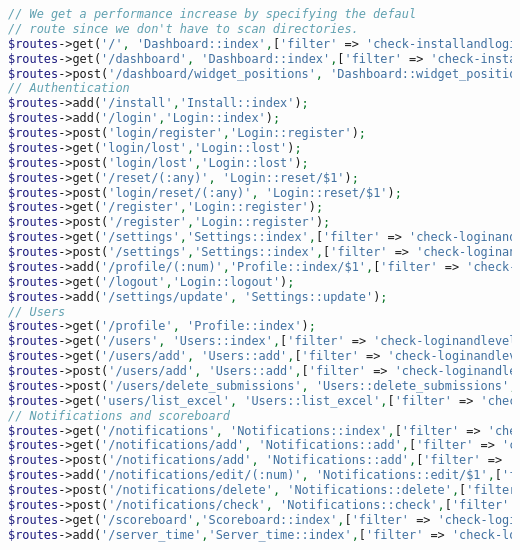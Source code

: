 \begin{lstlisting}[language=PHP, caption=Penambahan \textit{routes} yang digunakan pada aplikasi \textit{SharIF Judge}, label=kode:routesbab4]
// We get a performance increase by specifying the defaul
// route since we don't have to scan directories.
$routes->get('/', 'Dashboard::index',['filter' => 'check-installandlogin:dual,noreturn']);
$routes->get('/dashboard', 'Dashboard::index',['filter' => 'check-installandlogin:dual,noreturn']);
$routes->post('/dashboard/widget_positions', 'Dashboard::widget_positions');
// Authentication
$routes->add('/install','Install::index');
$routes->add('/login','Login::index');
$routes->post('login/register','Login::register');
$routes->get('login/lost','Login::lost');
$routes->post('login/lost','Login::lost');
$routes->get('/reset/(:any)', 'Login::reset/$1');
$routes->post('login/reset/(:any)', 'Login::reset/$1');
$routes->get('/register','Login::register');
$routes->post('/register','Login::register');
$routes->get('/settings','Settings::index',['filter' => 'check-loginandlevelAdmin:dual,noreturn']);
$routes->post('/settings','Settings::index',['filter' => 'check-loginandlevelAdmin:dual,noreturn']);
$routes->add('/profile/(:num)','Profile::index/$1',['filter' => 'check-login:dual,noreturn']);
$routes->get('/logout','Login::logout');
$routes->add('/settings/update', 'Settings::update');
// Users
$routes->get('/profile', 'Profile::index');
$routes->get('/users', 'Users::index',['filter' => 'check-loginandlevelAdmin:dual,noreturn']);
$routes->get('/users/add', 'Users::add',['filter' => 'check-loginandlevelAdmin:dual,noreturn']);
$routes->post('/users/add', 'Users::add',['filter' => 'check-loginandlevelAdmin:dual,noreturn']);
$routes->post('/users/delete_submissions', 'Users::delete_submissions',['filter' => 'check-loginandlevelAdmin:dual,noreturn']);
$routes->get('users/list_excel', 'Users::list_excel',['filter' => 'check-loginandlevelAdmin:dual,noreturn']);
// Notifications and scoreboard
$routes->get('/notifications', 'Notifications::index',['filter' => 'check-login:dual,noreturn']);
$routes->get('/notifications/add', 'Notifications::add',['filter' => 'check-login:dual,noreturn']);
$routes->post('/notifications/add', 'Notifications::add',['filter' => 'check-login:dual,noreturn']);
$routes->add('/notifications/edit/(:num)', 'Notifications::edit/$1',['filter' => 'check-login:dual,noreturn']);
$routes->post('/notifications/delete', 'Notifications::delete',['filter' => 'check-login:dual,noreturn']);
$routes->post('/notifications/check', 'Notifications::check',['filter' => 'check-login:dual,noreturn']);
$routes->get('/scoreboard','Scoreboard::index',['filter' => 'check-loginandcli:dual,noreturn']);
$routes->add('/server_time','Server_time::index',['filter' => 'check-loginandisajax:dual,noreturn']);

\end{lstlisting}
